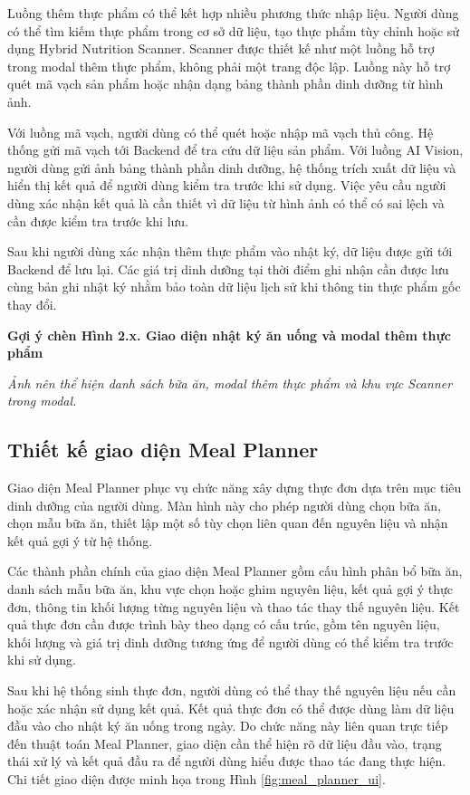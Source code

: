 \documentclass[12pt, a4paper]{report}
\begin{document}
Luồng thêm thực phẩm có thể kết hợp nhiều phương thức nhập liệu. Người dùng có thể tìm kiếm thực phẩm trong cơ sở dữ liệu, tạo thực phẩm tùy chỉnh hoặc sử dụng Hybrid Nutrition Scanner. Scanner được thiết kế như một luồng hỗ trợ trong modal thêm thực phẩm, không phải một trang độc lập. Luồng này hỗ trợ quét mã vạch sản phẩm hoặc nhận dạng bảng thành phần dinh dưỡng từ hình ảnh.

Với luồng mã vạch, người dùng có thể quét hoặc nhập mã vạch thủ công. Hệ thống gửi mã vạch tới Backend để tra cứu dữ liệu sản phẩm. Với luồng AI Vision, người dùng gửi ảnh bảng thành phần dinh dưỡng, hệ thống trích xuất dữ liệu và hiển thị kết quả để người dùng kiểm tra trước khi sử dụng. Việc yêu cầu người dùng xác nhận kết quả là cần thiết vì dữ liệu từ hình ảnh có thể có sai lệch và cần được kiểm tra trước khi lưu.

Sau khi người dùng xác nhận thêm thực phẩm vào nhật ký, dữ liệu được gửi tới Backend để lưu lại. Các giá trị dinh dưỡng tại thời điểm ghi nhận cần được lưu cùng bản ghi nhật ký nhằm bảo toàn dữ liệu lịch sử khi thông tin thực phẩm gốc thay đổi.

\textbf{Gợi ý chèn Hình 2.x. Giao diện nhật ký ăn uống và modal thêm thực phẩm}

\textit{Ảnh nên thể hiện danh sách bữa ăn, modal thêm thực phẩm và khu vực Scanner trong modal.}

\subsection{Thiết kế giao diện Meal Planner}Giao diện Meal Planner phục vụ chức năng xây dựng thực đơn dựa trên mục tiêu dinh dưỡng của người dùng. Màn hình này cho phép người dùng chọn bữa ăn, chọn mẫu bữa ăn, thiết lập một số tùy chọn liên quan đến nguyên liệu và nhận kết quả gợi ý từ hệ thống.

Các thành phần chính của giao diện Meal Planner gồm cấu hình phân bổ bữa ăn, danh sách mẫu bữa ăn, khu vực chọn hoặc ghim nguyên liệu, kết quả gợi ý thực đơn, thông tin khối lượng từng nguyên liệu và thao tác thay thế nguyên liệu. Kết quả thực đơn cần được trình bày theo dạng có cấu trúc, gồm tên nguyên liệu, khối lượng và giá trị dinh dưỡng tương ứng để người dùng có thể kiểm tra trước khi sử dụng.

Sau khi hệ thống sinh thực đơn, người dùng có thể thay thế nguyên liệu nếu cần hoặc xác nhận sử dụng kết quả. Kết quả thực đơn có thể được dùng làm dữ liệu đầu vào cho nhật ký ăn uống trong ngày. Do chức năng này liên quan trực tiếp đến thuật toán Meal Planner, giao diện cần thể hiện rõ dữ liệu đầu vào, trạng thái xử lý và kết quả đầu ra để người dùng hiểu được thao tác đang thực hiện. Chi tiết giao diện được minh họa trong Hình \ref{fig:meal_planner_ui}.
\end{document}
